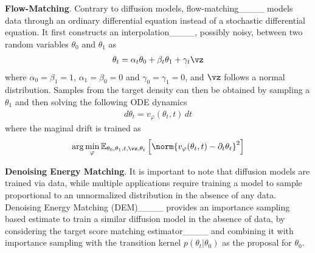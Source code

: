 \textbf{Flow-Matching}. Contrary to diffusion models, flow-matching____ models data through an ordinary differential equation instead of a stochastic differential equation. It first constructs an interpolation____, possibly noisy, between two random variables $\theta_0$ and $\theta_1$ as
\begin{align}
    \theta_t = \alpha_t \theta_0 + \beta_t \theta_1 + \gamma_t \vz
\end{align}
where $\alpha_0 = \beta_1 = 1$, $\alpha_1 = \beta_0 = 0$ and $\gamma_0 = \gamma_1 = 0$, and $\vz$ follows a normal distribution. Samples from the target density can then be obtained by sampling a $\theta_1$ and then solving the following ODE dynamics
\begin{align}
     d\theta_t = v_\varphi(\theta_t, t)\,dt
\end{align}
where the maginal drift is trained as
\begin{align}
    \arg\min_\varphi \mathbb{E}_{\theta_0, \theta_1, t, \vz, \theta_t}\left[\norm{v_\varphi(\theta_t, t) - \partial_t \theta_t}^2\right]
\end{align}

\textbf{Denoising Energy Matching}. It is important to note that diffusion models are trained via data, while multiple applications require training a model to sample proportional to an unnormalized distribution in the absence of any data. Denoising Energy Matching (DEM)____ provides an importance sampling based estimate to train a similar diffusion model in the absence of data, by considering the target score matching estimator____ and combining it with importance sampling with the transition kernel $p(\theta_t | \theta_0)$ as the proposal for $\theta_0$.